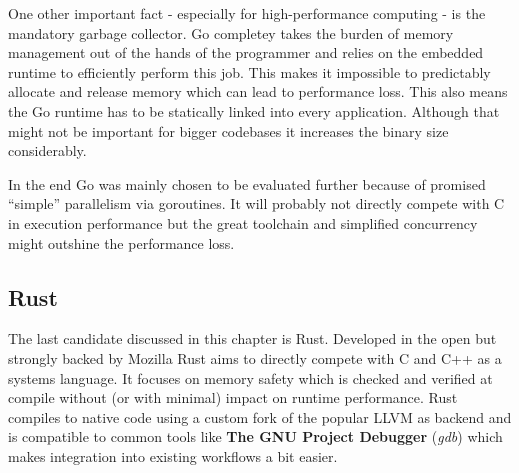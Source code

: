 One other important fact - especially for high-performance computing - is the mandatory garbage collector. Go completey takes the burden of memory management out of the hands of the programmer and relies on the embedded runtime to efficiently perform this job. This makes it impossible to predictably allocate and release memory which can lead to performance loss. This also means the Go runtime has to be statically linked into every application. Although that might not be important for bigger codebases it increases the binary size considerably.

In the end Go was mainly chosen to be evaluated further because of promised ``simple'' parallelism via goroutines. It will probably not directly compete with C in execution performance but the great toolchain and simplified concurrency might outshine the performance loss.



\subsection*{Rust}
\label{subsec:State_of_the_art::Candidates::Rust}

The last candidate discussed in this chapter is Rust. Developed in the open but strongly backed by Mozilla Rust aims to directly compete with C and C++ as a systems language. It focuses on memory safety which is checked and verified at compile without (or with minimal) impact on runtime performance. Rust compiles to native code using a custom fork of the popular LLVM as backend and is compatible to common tools like \textbf{The GNU Project Debugger} (\textit{gdb}) which makes integration into existing workflows a bit easier.

